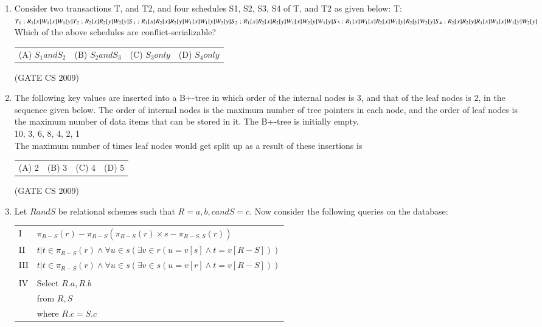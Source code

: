 \documentclass[a4paper, 11pt]{article}
\begin{document}
\begin{enumerate}
    \item Consider two transactions T, and T2, and four schedules S1, S2, S3, S4 of T, and T2 as given below: T: \\
    $
    T_1: R_1[x] W_1[x] W_1[y]\\
    T_2: R_2[x] R_2[y] W_2[y]\\
    S_1: R_1[x] R_2[x] R_2[y] W_1[x] W_1[y] W_2[y] \\
    S_2: R_1[x] R_2[x] R_2[y] W_1[x] W_2[y] W_1[y]\\
    S_3: R_1[x] W_1[x] R_2[x] W_1[y] R_2[y] W_2[y]\\
    S_4: R_2[x] R_2[y] R_1[x] W_1[x] W_1[y] W_2[y]\\
    $
    Which of the above schedules are conflict-serializable?\\
    \begin{tabularx}{\textwidth}{@{}XXXX@{}}
       (A) $S_1 and S_2$  & (B) $S_2 and S_3$ & (C) $S_3 only $ & (D) $S_4 only$  \\
    \end{tabularx}

    \hfill (GATE CS 2009)

    \item The following key values are inserted into a B+-tree in which order of the internal nodes is 3, and that of the leaf nodes is 2, in the sequence given below. The order of internal nodes is the maximum number of tree pointers in each node, and the order of leaf nodes is the maximum number of data items that can be stored in it. The B+-tree is initially empty.\\
    10, 3, 6, 8, 4, 2, 1\\
    The maximum number of times leaf nodes would get split up as a result of these insertions is\\
    \begin{tabularx}{\textwidth}{@{}XXXX@{}}
       (A) 2  & (B) 3 & (C) 4 & (D) 5  \\
    \end{tabularx}

    \hfill (GATE CS 2009)

    \item Let $R and S$ be relational schemes such that $R= {a,b,c} and S = {c}$. Now consider the following queries on the database:\\
    \begin{tabular}{ll}
        I & $\pi_{R-S}(r)-\pi_{R-S}(\pi_{R-S}(r)\times s-\pi_{R-S,S}(r))$ \\
        II & ${t|t \in \pi_{R-S}(r) \land \forall u \in s(\exists v \in r(u=v[s] \land t=v[R-S]))}$\\
        III & ${t|t \in \pi_{R-S}(r) \land \forall u \in s(\exists v \in s(u=v[r] \land t=v[R-S]))}$\\ \\
        IV & Select $R.a, R.b$\\
           & from $R, S$\\
           & where $R.c=S.c$
    \end{tabular}\\


\end{enumerate}
\end{document}
